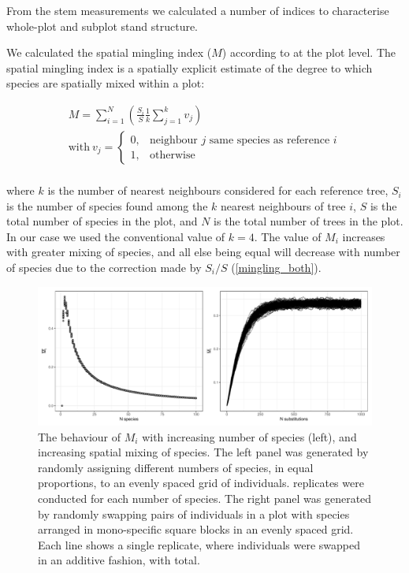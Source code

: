 \documentclass[11pt,a4paper]{article}
\begin{document}
From the stem measurements we calculated a number of indices to characterise whole-plot and subplot stand structure.

We calculated the spatial mingling index ($M$) according to \citet{Gadow2002} at the plot level. The spatial mingling index is a spatially explicit estimate of the degree to which species are spatially mixed within a plot:

\begin{gather}
	M = \sum_{i=1}^{N} (\frac{S_{i}}{S} \frac{1}{k} \sum_{j=1}^{k} v_{j})	\\
	\text{with}\ v_{j} = \begin{cases}
		0,& \text{neighbour $j$ same species as reference $i$} \\
		1,& \text{otherwise}
	\end{cases} \\
\end{gather}

where $k$ is the number of nearest neighbours considered for each reference tree, $S_{i}$ is the number of species found among the $k$ nearest neighbours of tree $i$, $S$ is the total number of species in the plot, and $N$ is the total number of trees in the plot. In our case we used the conventional value of $k = 4$. The value of $M_{i}$ increases with greater mixing of species, and all else being equal will decrease with number of species due to the correction made by $S_{i} / S$ (\autoref{mingling_both}).

\begin{figure}[H]
\centering
	\includegraphics[width=\textwidth]{mingling_both}
	\caption{The behaviour of $M_{i}$ with increasing number of species (left), and increasing spatial mixing of species. The left panel was generated by randomly assigning different numbers of species, in equal proportions, to an evenly spaced grid of individuals. \mispreps{} replicates were conducted for each number of species. The right panel was generated by randomly swapping pairs of individuals in a plot with \minsp{} species arranged in mono-specific square blocks in an evenly spaced grid. Each line shows a single replicate, where individuals were swapped in an additive fashion, with \minreps{} total.} 
	\label{mingling_both}
\end{figure}
\end{document}
